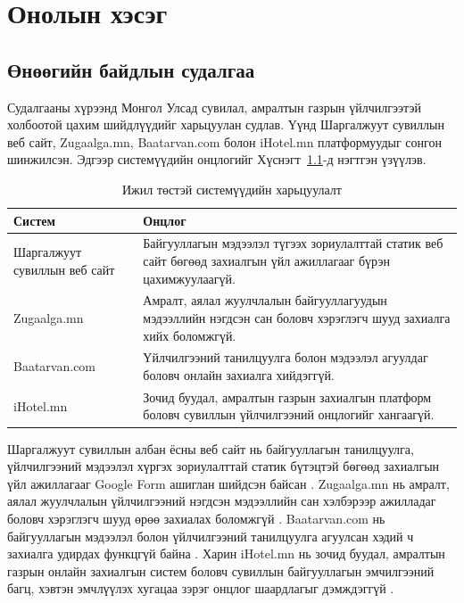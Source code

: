 \chapter{Онолын хэсэг}
\section{Өнөөгийн байдлын судалгаа}

Судалгааны хүрээнд Монгол Улсад сувилал, амралтын газрын үйлчилгээтэй холбоотой цахим шийдлүүдийг харьцуулан судлав. Үүнд Шаргалжуут сувиллын веб сайт, Zugaalga.mn, Baatarvan.com болон iHotel.mn платформуудыг сонгон шинжилсэн. Эдгээр системүүдийн онцлогийг Хүснэгт~\ref{tab:similar-systems}-д нэгтгэн үзүүлэв.

\begin{table}[H]
  \centering
  \caption{Ижил төстэй системүүдийн харьцуулалт}
  \label{tab:similar-systems}
  \renewcommand{\arraystretch}{1.3}
  \begin{tabular}{p{4cm}p{9cm}}
    \toprule
    \textbf{Систем} & \textbf{Онцлог} \\
    \midrule
    Шаргалжуут сувиллын веб сайт &
    Байгууллагын мэдээлэл түгээх зориулалттай статик веб сайт бөгөөд захиалгын үйл ажиллагааг бүрэн цахимжуулаагүй. \\
    \hline
    Zugaalga.mn &
    Амралт, аялал жуулчлалын байгууллагуудын мэдээллийн нэгдсэн сан боловч хэрэглэгч шууд захиалга хийх боломжгүй. \\
    \hline
    Baatarvan.com &
    Үйлчилгээний танилцуулга болон мэдээлэл агуулдаг боловч онлайн захиалга хийдэггүй. \\
    \hline
    iHotel.mn &
    Зочид буудал, амралтын газрын захиалгын платформ боловч сувиллын үйлчилгээний онцлогийг хангаагүй. \\
    \bottomrule
  \end{tabular}
\end{table}

Шаргалжуут сувиллын албан ёсны веб сайт нь байгууллагын танилцуулга, үйлчилгээний мэдээлэл хүргэх зориулалттай статик бүтэцтэй бөгөөд захиалгын үйл ажиллагааг Google Form ашиглан шийдсэн байсан \cite{shargaljuut2026}. Zugaalga.mn нь амралт, аялал жуулчлалын үйлчилгээний нэгдсэн мэдээллийн сан хэлбэрээр ажилладаг боловч хэрэглэгч шууд өрөө захиалах боломжгүй \cite{zugaalga2026}. Baatarvan.com нь байгууллагын мэдээлэл болон үйлчилгээний танилцуулга агуулсан хэдий ч захиалга удирдах функцгүй байна \cite{baatarvan2026}. Харин iHotel.mn нь зочид буудал, амралтын газрын онлайн захиалгын систем боловч сувиллын байгууллагын эмчилгээний багц, хэвтэн эмчлүүлэх хугацаа зэрэг онцлог шаардлагыг дэмждэггүй \cite{ihotel2026}.

